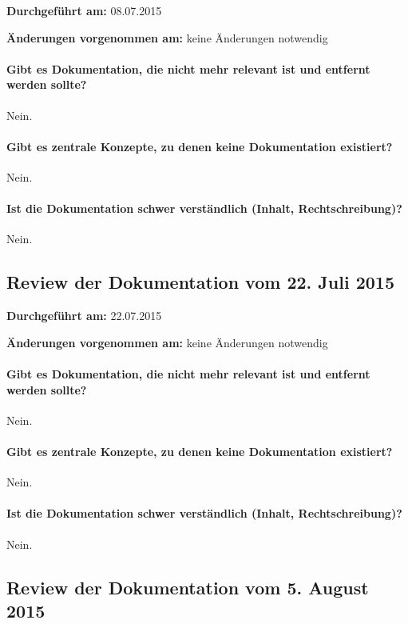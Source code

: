 \textbf{Durchgeführt am:} 08.07.2015

\textbf{Änderungen vorgenommen am:} keine Änderungen notwendig

\paragraph{Gibt es Dokumentation, die nicht mehr relevant ist und entfernt werden sollte?}
Nein.

\paragraph{Gibt es zentrale Konzepte, zu denen keine Dokumentation existiert?}
Nein.

\paragraph{Ist die Dokumentation schwer verständlich (Inhalt, Rechtschreibung)?}
Nein.


\subsection{Review der Dokumentation vom 22. Juli 2015}

\textbf{Durchgeführt am:} 22.07.2015

\textbf{Änderungen vorgenommen am:} keine Änderungen notwendig

\paragraph{Gibt es Dokumentation, die nicht mehr relevant ist und entfernt werden sollte?}
Nein.

\paragraph{Gibt es zentrale Konzepte, zu denen keine Dokumentation existiert?}
Nein.

\paragraph{Ist die Dokumentation schwer verständlich (Inhalt, Rechtschreibung)?}
Nein.


\subsection{Review der Dokumentation vom 5. August 2015}


